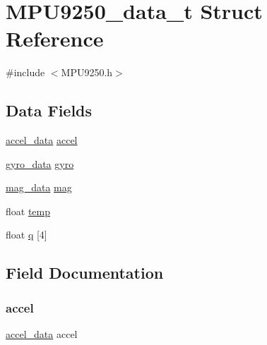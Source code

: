 \hypertarget{struct_m_p_u9250__data__t}{}\section{M\+P\+U9250\+\_\+data\+\_\+t Struct Reference}
\label{struct_m_p_u9250__data__t}


{\ttfamily \#include $<$M\+P\+U9250.\+h$>$}

\subsection*{Data Fields}
\begin{DoxyCompactItemize}
\item 
\mbox{\hyperlink{_m_p_u9250_8h_a144c0dc94c45f44d3204133196bccb8d}{accel\+\_\+data}} \mbox{\hyperlink{struct_m_p_u9250__data__t_a10503aeabf50647a33a7beaa3f7d09b1}{accel}}
\item 
\mbox{\hyperlink{_m_p_u9250_8h_a679cb4e3d714372e6c56230980ebc835}{gyro\+\_\+data}} \mbox{\hyperlink{struct_m_p_u9250__data__t_ab48b0c0691be94cd5f80eef0f2fbe7af}{gyro}}
\item 
\mbox{\hyperlink{_m_p_u9250_8h_a6a87651f18d8b5cd90c9b5a8c47b78c2}{mag\+\_\+data}} \mbox{\hyperlink{struct_m_p_u9250__data__t_adffaef9acb11b2eb377e9e7567b0fbb2}{mag}}
\item 
float \mbox{\hyperlink{struct_m_p_u9250__data__t_a24d61a35b72d7299eb6b5f48e71a571b}{temp}}
\item 
float \mbox{\hyperlink{struct_m_p_u9250__data__t_acbffa34110f15b21994d3d087a0f4e7f}{q}} \mbox{[}4\mbox{]}
\end{DoxyCompactItemize}


\subsection{Field Documentation}
\mbox{\label{struct_m_p_u9250__data__t_a10503aeabf50647a33a7beaa3f7d09b1}} 
\subsubsection{\texorpdfstring{accel}{accel}}
{\footnotesize\ttfamily \mbox{\hyperlink{_m_p_u9250_8h_a144c0dc94c45f44d3204133196bccb8d}{accel\+\_\+data}} accel}

\mbox{\label{struct_m_p_u9250__data__t_ab48b0c0691be94cd5f80eef0f2fbe7af}} 
